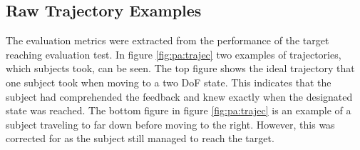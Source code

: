 
\subsection{Raw Trajectory Examples}

The evaluation metrics were extracted from the performance of the target reaching evaluation test. In figure \ref{fig:pa:trajec} two examples of trajectories, which subjects took, can be seen. The top figure shows the ideal trajectory that one subject took when moving to a two DoF state. This indicates that the subject had comprehended the feedback and knew exactly when the designated state was reached. The bottom figure in figure \ref{fig:pa:trajec} is an example of a subject traveling to far down before moving to the right. However, this was corrected for as the subject still managed to reach the target.

